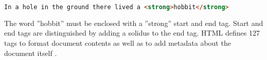 \begin{lstlisting}[language=html, caption=Text formatted as bold with the ''strong'' tag, label=lst:html_markup_bold_example]
In a hole in the ground there lived a <strong>hobbit</strong>
\end{lstlisting}

The word ''hobbit'' must be enclosed with a ''strong'' start and end tag. Start and end tags are distinguished by adding a solidus to the end tag. HTML defines 127 tags to format document contents as well as to add metadata about the document itself \cite{mozel}.%








